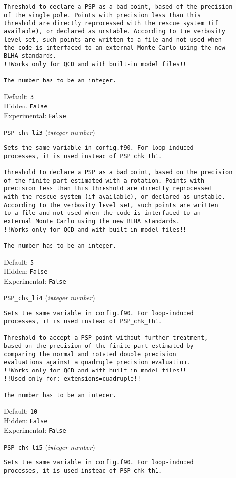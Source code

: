 \begin{basedescript}{\desclabelstyle{\pushlabel}}
\begin{verbatim}
Threshold to declare a PSP as a bad point, based of the precision
of the single pole. Points with precision less than this
threshold are directly reprocessed with the rescue system (if
available), or declared as unstable. According to the verbosity
level set, such points are written to a file and not used when
the code is interfaced to an external Monte Carlo using the new
BLHA standards.
!!Works only for QCD and with built-in model files!!

The number has to be an integer.
\end{verbatim}
Default: \verb|3|
\\Hidden: \verb|False|
\\Experimental: \verb|False|
\\\item[\colorbox{gray!30}{\texttt{PSP\_chk\_li3}}] (\textit{integer number})
\begin{verbatim}
Sets the same variable in config.f90. For loop-induced
processes, it is used instead of PSP_chk_th1.

Threshold to declare a PSP as a bad point, based on the precision
of the finite part estimated with a rotation. Points with
precision less than this threshold are directly reprocessed
with the rescue system (if available), or declared as unstable.
According to the verbosity level set, such points are written
to a file and not used when the code is interfaced to an
external Monte Carlo using the new BLHA standards.
!!Works only for QCD and with built-in model files!!

The number has to be an integer.
\end{verbatim}
Default: \verb|5|
\\Hidden: \verb|False|
\\Experimental: \verb|False|
\\\item[\colorbox{gray!30}{\texttt{PSP\_chk\_li4}}] (\textit{integer number})
\begin{verbatim}
Sets the same variable in config.f90. For loop-induced
processes, it is used instead of PSP_chk_th1.

Threshold to accept a PSP point without further treatment,
based on the precision of the finite part estimated by
comparing the normal and rotated double precision
evaluations against a quadruple precision evaluation.
!!Works only for QCD and with built-in model files!!
!!Used only for: extensions=quadruple!!

The number has to be an integer.
\end{verbatim}
Default: \verb|10|
\\Hidden: \verb|False|
\\Experimental: \verb|False|
\\\item[\colorbox{gray!30}{\texttt{PSP\_chk\_li5}}] (\textit{integer number})
\begin{verbatim}
Sets the same variable in config.f90. For loop-induced
processes, it is used instead of PSP_chk_th1.


\end{verbatim}
\end{basedescript}
